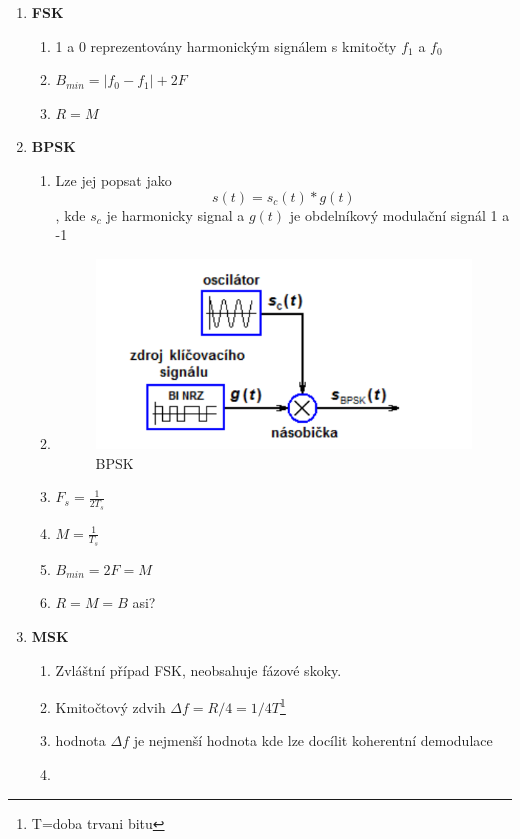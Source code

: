 \begin{enumerate}
\begin{enumerate}
    \end{enumerate}
    \item \textbf{FSK}
    \begin{enumerate}
        \item 1 a 0 reprezentovány harmonickým signálem s kmitočty $f_1$ a $f_0$
            \item $B_{min}=|f_0-f_1|+2F$
        \item $R=M$
    \end{enumerate}
    \item \textbf{BPSK}
    \begin{enumerate}
        \item Lze jej popsat jako $$s(t)=s_c(t)*g(t)$$, kde $s_c$ je harmonicky signal a $g(t)$ je obdelníkový modulační signál 1 a -1
        \item \begin{figure}[h!]
            \centering
            \includegraphics[scale=0.5]{images/BPSK.png}
            \caption{BPSK}
            \label{fig:enter-label}
        \end{figure}
        \item $F_s=\frac{1}{2T_s}$
        \item $M=\frac{1}{T_s}$
        \item $B_{min}=2F=M$
        \item $R=M=B$ asi?
    \end{enumerate}
   \item \textbf{MSK}
   \begin{enumerate}
       \item Zvláštní případ FSK, neobsahuje fázové skoky.
       \item Kmitočtový zdvih $\Delta f= R/4=1/4T$\footnote{T=doba trvani bitu}
       \item hodnota $\Delta f$ je nejmenší hodnota kde lze docílit koherentní demodulace
       \item \begin{figure}[h!]

\end{figure}
\end{enumerate}
\end{enumerate}
